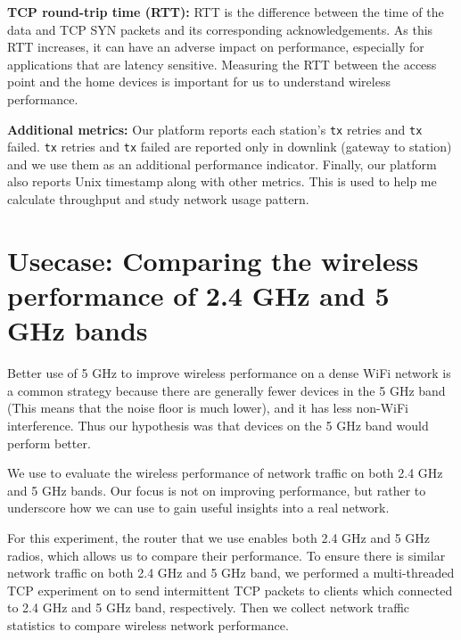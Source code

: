 \textbf{TCP round-trip time (RTT):} RTT is the difference between the time of the data and TCP SYN packets and its corresponding acknowledgements. As this RTT increases, it can have an adverse impact on performance, especially for applications that are latency sensitive. Measuring the RTT between the access point and the home devices is important for us to understand wireless performance.

\textbf{Additional metrics:} Our platform reports each station's \texttt{tx} retries and \texttt{tx} failed. \texttt{tx} retries and \texttt{tx} failed are reported only in downlink (gateway to station) and we use them as an additional performance indicator. Finally, our platform also reports Unix timestamp along with other metrics. This is used to help me calculate throughput and study network usage pattern. 

\section{Usecase: Comparing the wireless performance of 2.4 GHz and 5 GHz bands}
\label{sec.usecase1}

Better use of 5 GHz to improve wireless performance on a dense WiFi network is a common strategy because there are generally fewer devices in the 5 GHz band (This means that the noise floor is much lower), and it has less non-WiFi interference. Thus our hypothesis was that devices on the 5 GHz band would perform better.

We use \sysname to evaluate the wireless performance of network traffic on both 2.4 GHz and 5 GHz bands. Our focus is not on improving performance, but rather to underscore how we can use \sysname to gain useful insights into a real network.

For this experiment, the router that we use enables both 2.4 GHz and 5 GHz radios, which allows us to compare their performance. To ensure there is similar network traffic on both 2.4 GHz and 5 GHz band, we performed a multi-threaded TCP experiment on \sysname to send intermittent TCP packets to clients which connected to 2.4 GHz and 5 GHz band, respectively. Then we collect network traffic statistics to compare wireless network performance.

